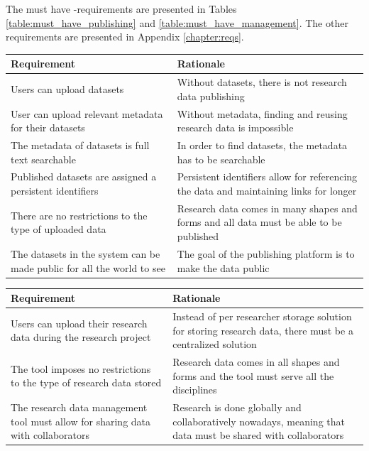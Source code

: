 The must have -requirements are presented in Tables \ref{table:must_have_publishing} and
\ref{table:must_have_management}. The other requirements are presented in Appendix
\ref{chapter:reqs}.

\addtocounter{table}{-1}
\label{table:must_have_publishing}
    \begin{tabularx}{\textwidth}{| >{\raggedright}p{3cm} | X |}
    \hline
    \textbf{Requirement} & \textbf{Rationale} \\
    \hline
    \rowcolor{Gray}
    Users can upload datasets    & Without datasets, there is not research data publishing\\
    \hline
    User can upload relevant metadata for their datasets & Without metadata, finding and reusing research data is impossible\\
    \hline
    \rowcolor{Gray}
    The metadata of datasets is full text searchable    &  In order to find datasets, the metadata has to be searchable\\
    \hline
    Published datasets are assigned a persistent identifiers    & Persistent identifiers allow for referencing the data and maintaining links for longer\\
    \hline
    \rowcolor{Gray}
    There are no restrictions to the type of uploaded data          & Research data comes in many shapes and forms and all data must be able to be published\\
    \hline
    The datasets in the system can be made public for all the world to see    & The goal of the publishing platform is to make the data public\\
    \hline
\end{tabularx}

\pagebreak

\addtocounter{table}{-1}
\label{table:must_have_management}
    \begin{tabularx}{\textwidth}{| >{\raggedright}p{3cm} | X |}
    \hline
    \textbf{Requirement} & \textbf{Rationale} \\
    \hline
    \rowcolor{Gray}
    Users can upload their research data during the research project    & Instead of per researcher storage solution for storing research data, there must be a centralized solution\\
    \hline
    The tool imposes no restrictions to the type of research data stored & Research data comes in all shapes and forms and the tool must serve all the disciplines\\
    \hline
    \rowcolor{Gray}
    The research data management tool must allow for sharing data with collaborators    &  Research is done globally and collaboratively nowadays, meaning that data must be shared with collaborators\\
    \hline
\end{tabularx}
